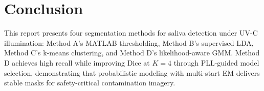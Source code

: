 \section{Conclusion}

This report presents four segmentation methods for saliva detection under UV-C illumination: Method A's MATLAB thresholding, Method B's supervised LDA, Method C's k-means clustering, and Method D's likelihood-aware GMM. Method D achieves high recall while improving Dice at \(K=4\) through PLL-guided model selection, demonstrating that probabilistic modeling with multi-start EM delivers stable masks for safety-critical contamination imagery.

